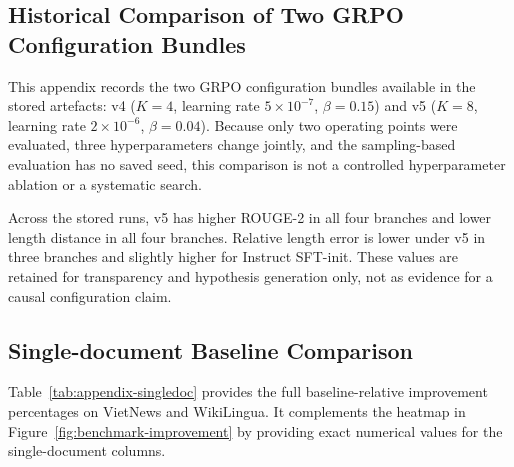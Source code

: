 \documentclass[11pt]{article}
\begin{document}
\subsection{Historical Comparison of Two GRPO Configuration Bundles}
\label{sec:appendix-v4v5}
This appendix records the two GRPO configuration bundles available in the stored artefacts: v4 ($K=4$, learning rate $5\times10^{-7}$, $\beta=0.15$) and v5 ($K=8$, learning rate $2\times10^{-6}$, $\beta=0.04$).
Because only two operating points were evaluated, three hyperparameters change jointly, and the sampling-based evaluation has no saved seed, this comparison is not a controlled hyperparameter ablation or a systematic search.

\begin{table}[H]
\centering
\caption{Historical comparison of two explored GRPO configuration bundles on VietNews and WikiLingua macro averages. These observations do not identify the effect of any individual hyperparameter or establish a globally optimal configuration}
\label{tab:v4v5}
\small
{}
\end{table}

Across the stored runs, v5 has higher ROUGE-2 in all four branches and lower length distance in all four branches.
Relative length error is lower under v5 in three branches and slightly higher for Instruct SFT-init.
These values are retained for transparency and hypothesis generation only, not as evidence for a causal configuration claim.

\subsection{Single-document Baseline Comparison}
\label{sec:appendix-singledoc}
Table~\ref{tab:appendix-singledoc} provides the full baseline-relative improvement percentages on VietNews and WikiLingua.
It complements the heatmap in Figure~\ref{fig:benchmark-improvement} by providing exact numerical values for the single-document columns.
\end{document}

